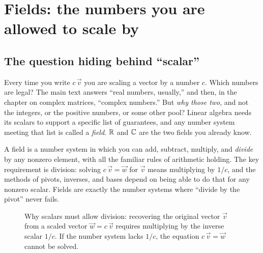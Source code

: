 \section{Fields: the numbers you are allowed to scale by}
\label{ch38:fields}

\subsection{The question hiding behind ``scalar''}

Every time you write $c\,\vec{v}$ you are scaling a vector by a number $c$. Which numbers
are legal? The main text answers ``real numbers, usually,'' and then, in the chapter on
complex matrices, ``complex numbers.'' But \emph{why those two}, and not the integers, or
the positive numbers, or some other pool? Linear algebra
needs its scalars to support a specific list of guarantees, and any number system
meeting that list is called a \emph{field}. $\mathbb{R}$ and $\mathbb{C}$ are the two fields you
already know.

\begin{intuitionbox}
A field is a number system in which you can add, subtract, multiply, and
\emph{divide} by any nonzero element, with all the familiar rules of arithmetic holding.
The key requirement is division: solving $c\,\vec{v} = \vec{w}$ for $\vec{v}$ means
multiplying by $1/c$, and the methods of pivots, inverses, and bases depend on
being able to do that for any nonzero scalar. Fields are exactly the number systems where
``divide by the pivot'' never fails.
\end{intuitionbox}

\begin{figure}[H]
\centering
{}
\caption{Why scalars must allow division: recovering the original vector $\vec{v}$ from a scaled vector $\vec{w} = c\,\vec{v}$ requires multiplying by the inverse scalar $1/c$. If the number system lacks $1/c$, the equation $c\,\vec{v} = \vec{w}$ cannot be solved.}
\label{ch38:division-scale}
\end{figure}

